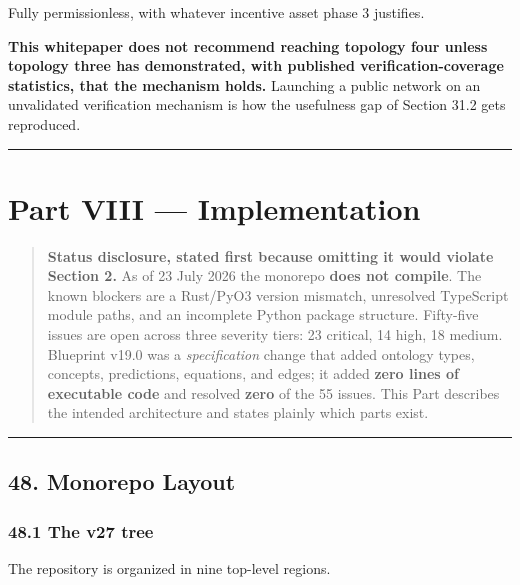 \documentclass[
  11pt]{report}
\begin{document}
Fully permissionless, with whatever incentive asset phase 3 justifies.

\textbf{This whitepaper does not recommend reaching topology four unless
topology three has demonstrated, with published verification-coverage
statistics, that the mechanism holds.} Launching a public network on an
unvalidated verification mechanism is how the usefulness gap of Section
31.2 gets reproduced.

\begin{center}\rule{0.5\linewidth}{0.5pt}\end{center}

\hypertarget{part-viii-implementation}{%
\part{Part VIII --- Implementation}\label{part-viii-implementation}}

\begin{quote}
\textbf{Status disclosure, stated first because omitting it would
violate Section 2.} As of 23 July 2026 the monorepo \textbf{does not
compile}. The known blockers are a Rust/PyO3 version mismatch,
unresolved TypeScript module paths, and an incomplete Python package
structure. Fifty-five issues are open across three severity tiers: 23
critical, 14 high, 18 medium. Blueprint v19.0 was a \emph{specification}
change that added ontology types, concepts, predictions, equations, and
edges; it added \textbf{zero lines of executable code} and resolved
\textbf{zero} of the 55 issues. This Part describes the intended
architecture and states plainly which parts exist.
\end{quote}

\begin{center}\rule{0.5\linewidth}{0.5pt}\end{center}

\hypertarget{monorepo-layout}{%
\chapter{48. Monorepo Layout}\label{monorepo-layout}}

\hypertarget{the-v27-tree}{%
\section{48.1 The v27 tree}\label{the-v27-tree}}

The repository is organized in nine top-level regions.
\end{document}
